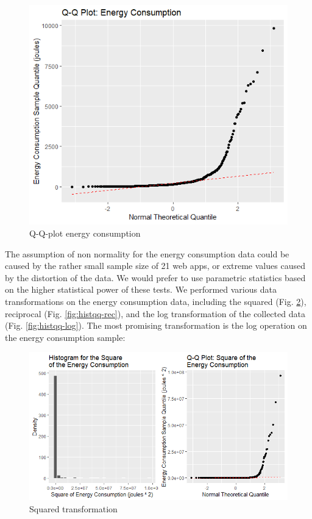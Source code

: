 \begin{figure}[H]
  \includegraphics[width=\linewidth]{./NewImages/Fig_7_QQPLOT_RAW.png}
  \caption{Q-Q-plot energy consumption}
  \label{fig:qqec}
\end{figure}

The assumption of non normality for the energy consumption data could be caused by the rather small sample size of 21 web apps, or extreme values caused by the distortion of the data. We would prefer to use parametric statistics based on the higher statistical power of these tests. We performed various data transformations on the energy consumption data, including the squared (Fig. \ref{fig:histqq-sqr}), reciprocal (Fig. \ref{fig:histqq-rec}), and the log transformation of the collected data (Fig. \ref{fig:histqq-log}). The most promising transformation is the log operation on the energy consumption sample:

\begin{figure}[H]
  \includegraphics[width=\linewidth]{./NewImages/Fig_8_Squared_Transform.png}
  \caption{Squared transformation}
  \label{fig:histqq-sqr}
\end{figure}

